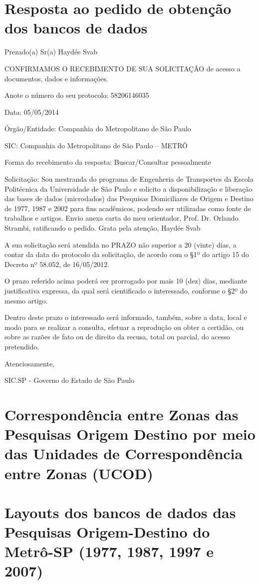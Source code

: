 \chapter{Resposta ao pedido de obtenção dos bancos de dados}\label{chap:esic}

Prezado(a) Sr(a) Haydée Svab

CONFIRMAMOS O RECEBIMENTO DE SUA SOLICITAÇÃO de acesso a documentos, dados e informações.

Anote o número do seu protocolo: 58206146035

Data: 05/05/2014

Órgão/Entidade:  Companhia do Metropolitano de São Paulo

SIC:  Companhia do Metropolitano de São Paulo – METRÔ

Forma do recebimento da resposta: Buscar/Consultar pessoalmente

Solicitação:
Sou mestranda do programa de Engenheria de Transportes da Escola Politécnica da Universidade de São Paulo e solicito a disponibilização e liberação das bases de dados (microdados) das Pesquisas Domiciliares de Origem e Destino de 1977, 1987 e 2002 para fins acadêmicos, podendo ser utilizadas como fonte de trabalhos e artigos.
Envio anexa carta do meu orientador, Prof. Dr. Orlando Strambi, ratificando o pedido.
Grata pela atenção,
Haydée Svab

A sua solicitação será atendida no PRAZO não superior a 20 (vinte) dias, a contar da data do protocolo da solicitação, de acordo com o \S1º do artigo 15 do Decreto nº 58.052, de 16/05/2012.

O prazo referido acima poderá ser prorrogado por mais 10 (dez) dias, mediante justificativa expressa, da qual será cientificado o interessado, conforme o \S2º do mesmo artigo.

Dentro deste prazo o interessado será informado, também, sobre a data, local e modo para se realizar a consulta, efetuar a reprodução ou obter a certidão, ou sobre as razões de fato ou de direito da recusa, total ou parcial, do acesso pretendido.

Atenciosamente,

SIC.SP - Governo do Estado de São Paulo 
\chapter{Correspondência entre Zonas das Pesquisas Origem Destino por meio das Unidades de Correspondência entre Zonas (UCOD)}\label{chap:anexo_ucod}



\chapter{Layouts dos bancos de dados das Pesquisas Origem-Destino do Metrô-SP (1977, 1987, 1997 e 2007)}\label{chap:anexo_layouts}




%


